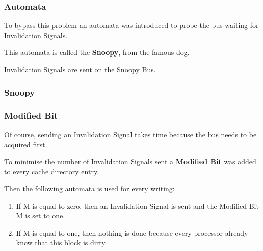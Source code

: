 
\begin{frame}
  \frametitle{Automata}

  To bypass this problem an automata was introduced to probe the bus
  waiting for Invalidation Signals.

  \nl

  This automata is called the \textbf{Snoopy}, from the famous dog.

  \nl

  Invalidation Signals are sent on the Snoopy Bus.
\end{frame}


\begin{frame}
  \frametitle{Snoopy}

  \begin{center}
  \end{center}
\end{frame}


\begin{frame}
  \frametitle{Modified Bit}

  Of course, sending an Invalidation Signal takes time because the bus needs
  to be acquired first.

  \nl

  To minimise the number of Invalidation Signals sent a \textbf{Modified Bit}
  was added to every cache directory entry.

  \nl

  Then the following automata is used for every writing:

  \begin{enumerate}[<+->]
    \item
      If M is equal to zero, then an Invalidation Signal is sent and the
      Modified Bit M is set to one.
    \item
      If M is equal to one, then nothing is done because every processor
      already know that this block is dirty.
  \end{enumerate}
\end{frame}


